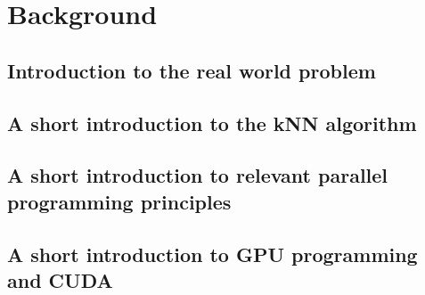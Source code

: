 \section{Background}

\subsection{Introduction to the real world problem} %
\label{sub:introduction_to_the_real_world_problem}


\subsection{A short introduction to the kNN algorithm} %
\label{a_short_introduction_to_the_kNN_algorithm}


\subsection{A short introduction to relevant parallel programming principles} %
\label{sub:a_short_introduction_to_relevant_parallel_programming_principles}


\subsection{A short introduction to GPU programming and CUDA} %
\label{sub:a_short_introduction_to_gpu_programming_and_cuda}


